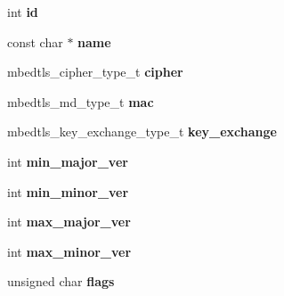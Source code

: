 \begin{DoxyCompactItemize}
\item 
\mbox{\label{structmbedtls__ssl__ciphersuite__t_a04315a97cb3a0c4f2065131095af18f9}} 
int {\bfseries id}
\item 
\mbox{\label{structmbedtls__ssl__ciphersuite__t_aa77bcf2ac4c95f819bd1fd3c60daf7c6}} 
const char $\ast$ {\bfseries name}
\item 
\mbox{\label{structmbedtls__ssl__ciphersuite__t_ab700258b521262a10786ee820009d0bd}} 
mbedtls\+\_\+cipher\+\_\+type\+\_\+t {\bfseries cipher}
\item 
\mbox{\label{structmbedtls__ssl__ciphersuite__t_a4ff359e034af1dd11eee3af8ba90e33b}} 
mbedtls\+\_\+md\+\_\+type\+\_\+t {\bfseries mac}
\item 
\mbox{\label{structmbedtls__ssl__ciphersuite__t_a4099ed119c2893364c2d3e1eba397106}} 
mbedtls\+\_\+key\+\_\+exchange\+\_\+type\+\_\+t {\bfseries key\+\_\+exchange}
\item 
\mbox{\label{structmbedtls__ssl__ciphersuite__t_a1a9b466f9fd946543595fc7edb47f3e7}} 
int {\bfseries min\+\_\+major\+\_\+ver}
\item 
\mbox{\label{structmbedtls__ssl__ciphersuite__t_aee8ff3239d90fdca2edeb4f4aec3776e}} 
int {\bfseries min\+\_\+minor\+\_\+ver}
\item 
\mbox{\label{structmbedtls__ssl__ciphersuite__t_aa0c974d0a42ecdf41cc8a0f23276cd37}} 
int {\bfseries max\+\_\+major\+\_\+ver}
\item 
\mbox{\label{structmbedtls__ssl__ciphersuite__t_a30838dbab879beba0059b2a56529177d}} 
int {\bfseries max\+\_\+minor\+\_\+ver}
\item 
\mbox{\label{structmbedtls__ssl__ciphersuite__t_a91c0ec15468b4cbb8f4f1c9861fe2456}} 
unsigned char {\bfseries flags}
\end{DoxyCompactItemize}


